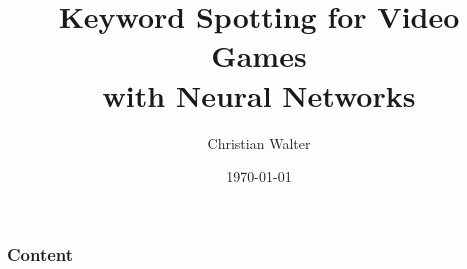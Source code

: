 \documentclass{beamer}
\title[Keyword Spotting for Video Games with Neural Networks]{Keyword Spotting for Video Games\\with Neural Networks}
\author{Christian Walter}
\date{\today}
\begin{document}
\titleframe

\begin{frame}
  \frametitle{Content}
  \tableofcontents
\end{frame}











\end{document}
